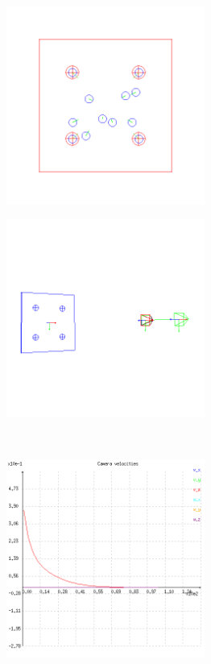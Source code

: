 \begin{figure}[ht!]
\begin{mdframed}[linecolor=black!30,backgroundcolor=black!5]
  \centering
  \begin{subfigure}{.48\linewidth}
    \centering
    \includegraphics[width=65mm]{figures/plots/ex2pimage.png}
    \caption{}
    \label{fig:ex2pimage}
  \end{subfigure}
  \begin{subfigure}{.48\linewidth}
    \centering
    \includegraphics[width=65mm]{figures/plots/ex2pscene.png}
    \caption{}
    \label{fig:ex2pscene}
  \end{subfigure}
  \\
  \begin{subfigure}{.48\linewidth}
    \centering
    \includegraphics[width=65mm]{figures/plots/ex2pvelocity.png}

\end{subfigure}
\end{mdframed}
\end{figure}

